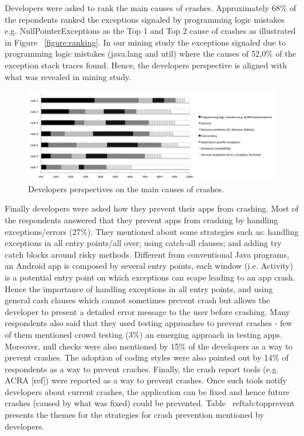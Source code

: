 
Developers were asked to rank the main causes of crashes. Approximately 68\% of the repondents ranked the exceptions signaled by programming logic mistakes e.g. NullPointerExceptions as the Top 1 and Top 2 cause of crashes as illustrated in Figure ~\ref{figure:ranking}. In our mining study the exceptions signaled due to programming logic mistakes (java.lang and util) where the causes of 52,0\% of the exception stack traces found. Hence, the developers perspective is aligned with what was revealed in mining study.

\begin{figure} 
\centering \includegraphics[width=.9\hsize]{charts/maincauses.png}
\caption{Developers perspectives on the main causes of crashes.}\label{fig:ranking} 
\end{figure}


Finally developers were asked how they prevent their apps from crashing. Most of the respondents answered that they prevent apps from crashing by handling exceptions/errors (27\%). They mentioned about some strategies such as: handling exceptions in all entry points/all over; using catch-all clauses; and adding try catch blocks around risky methods. Different from conventional Java programs, an Android app is composed by several entry points, each window (i.e. Activity) is a potential entry point on which exceptions can scape leading to an app crash. Hence the importance of handling exceptions in all entry points, and using general cash clauses which cannot sometimes prevent crash but allows the developer to present a detailed error message to the user before crashing. Many respondents also said that they used testing approaches to prevent crashes -  few of them mentioned crowd testing (3\%) an emerging approach in testing apps. Moreover, null checks were also mentioned by 15\% of the developers as a way to prevent crashes. The adoption of coding styles were also pointed out by 14\% of respondents as a way to prevent craches. Finally, the crash report tools (e.g. ACRA [ref]) were reported as a way to prevent crashes. Once such tools notify developers about current crashes, the application can be fixed and hence future crashes (caused by what was fixed) could be prevented. Table ~ref{tab:topprevent} presents the themes for the strategies for crash prevention mentioned by developers.	 					
			


